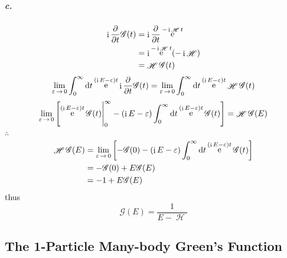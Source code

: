 \documentclass[a4paper]{article}
\DeclareMathOperator{\intinf}{\int_0^\infty}
\DeclareMathOperator{\e}{\mathrm{e}}
\DeclareMathOperator{\I}{\mathrm{i}}
\DeclareMathOperator{\ra}{\rightarrow}
\DeclareMathOperator{\sH}{\mathscr{H}}
\newcommand{\subex}[1]{\subparagraph{#1}}
\numberwithin{equation}{subsection}
\begin{document}
\subex{c.}
\begin{align}
\I \pdv{t}\mathscr{G}(t) &= \I \pdv{t}\e^{-\I\sH t} \notag\\
&= \I \e^{-\I\sH t}(-\I\sH) \notag\\
&= \sH \mathscr{G}(t)
\end{align}
\begin{align}
\lim_{\varepsilon\ra 0} \intinf\dd t \e^{(\I E - \varepsilon)t} \I \pdv{t}\mathscr{G}(t) = \lim_{\varepsilon\ra 0} \intinf\dd t \e^{(\I E - \varepsilon)t} \sH \mathscr{G}(t)
\end{align}
\begin{align}
\lim_{\varepsilon\ra 0} 
\qty[\e^{(\I E - \varepsilon)t}\mathscr{G}(t) \Bigg|_0^\infty 
- (\I E - \varepsilon)\intinf\dd t \e^{(\I E - \varepsilon)t} \mathscr{G}(t) ] 
= \sH\mathscr{G}(E)
\end{align}
$ \therefore $
\begin{align}
\sH\mathscr{G}(E) &=\lim_{\varepsilon\ra 0} 
\qty[-\mathscr{G}(0)
- (\I E - \varepsilon)\intinf\dd t \e^{(\I E - \varepsilon)t} \mathscr{G}(t) ] \notag\\
&= -\mathscr{G}(0) + E \mathscr{G}(E) \notag\\
&= -1 + E \mathscr{G}(E) 
\end{align}
thus
\begin{equation}\label{key}
\mathscr{G}(E) = \dfrac{1}{E - \sH}
\end{equation}

\subsection{The 1-Particle Many-body Green's Function}
\end{document}
